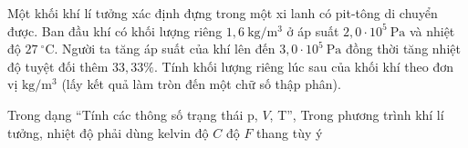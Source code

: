 \begin{ex}
Một khối khí lí tưởng xác định đựng trong một xi lanh có pit-tông di chuyển được. Ban đầu khí có khối lượng riêng $1,6\ \mathrm{kg/m^3}$ ở áp suất $2,0 \cdot 10^5\ \mathrm{Pa}$ và nhiệt độ $27\ ^\circ\mathrm{C}$. Người ta tăng áp suất của khí lên đến $3,0 \cdot 10^5\ \mathrm{Pa}$ đồng thời tăng nhiệt độ tuyệt đối thêm $33,33\%$. Tính khối lượng riêng lúc sau của khối khí theo đơn vị $\mathrm{kg/m^3}$ (lấy kết quả làm tròn đến một chữ số thập phân).
\end{ex}

\begin{ex}
Trong dạng “Tính các thông số trạng thái p, $V$, T”, Trong phương trình khí lí tưởng, nhiệt độ phải dùng
\choice
{\True kelvin}
{độ $C$}
{độ $F$}
{thang tùy ý}
\end{ex}

